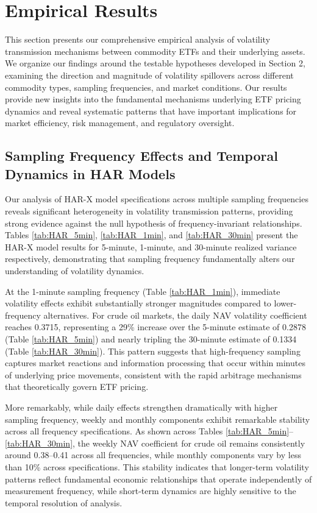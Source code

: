 
\section{Empirical Results} \label{sec:results}

This section presents our comprehensive empirical analysis of volatility transmission mechanisms between commodity ETFs and their underlying assets. We organize our findings around the testable hypotheses developed in Section 2, examining the direction and magnitude of volatility spillovers across different commodity types, sampling frequencies, and market conditions. Our results provide new insights into the fundamental mechanisms underlying ETF pricing dynamics and reveal systematic patterns that have important implications for market efficiency, risk management, and regulatory oversight.

\subsection{Sampling Frequency Effects and Temporal Dynamics in HAR Models}

Our analysis of HAR-X model specifications across multiple sampling frequencies reveals significant heterogeneity in volatility transmission patterns, providing strong evidence against the null hypothesis of frequency-invariant relationships. Tables \ref{tab:HAR_5min}, \ref{tab:HAR_1min}, and \ref{tab:HAR_30min} present the HAR-X model results for 5-minute, 1-minute, and 30-minute realized variance respectively, demonstrating that sampling frequency fundamentally alters our understanding of volatility dynamics.

At the 1-minute sampling frequency (Table \ref{tab:HAR_1min}), immediate volatility effects exhibit substantially stronger magnitudes compared to lower-frequency alternatives. For crude oil markets, the daily NAV volatility coefficient reaches 0.3715, representing a 29\% increase over the 5-minute estimate of 0.2878 (Table \ref{tab:HAR_5min}) and nearly tripling the 30-minute estimate of 0.1334 (Table \ref{tab:HAR_30min}). This pattern suggests that high-frequency sampling captures market reactions and information processing that occur within minutes of underlying price movements, consistent with the rapid arbitrage mechanisms that theoretically govern ETF pricing.

More remarkably, while daily effects strengthen dramatically with higher sampling frequency, weekly and monthly components exhibit remarkable stability across all frequency specifications. As shown across Tables \ref{tab:HAR_5min}--\ref{tab:HAR_30min}, the weekly NAV coefficient for crude oil remains consistently around 0.38--0.41 across all frequencies, while monthly components vary by less than 10\% across specifications. This stability indicates that longer-term volatility patterns reflect fundamental economic relationships that operate independently of measurement frequency, while short-term dynamics are highly sensitive to the temporal resolution of analysis.

